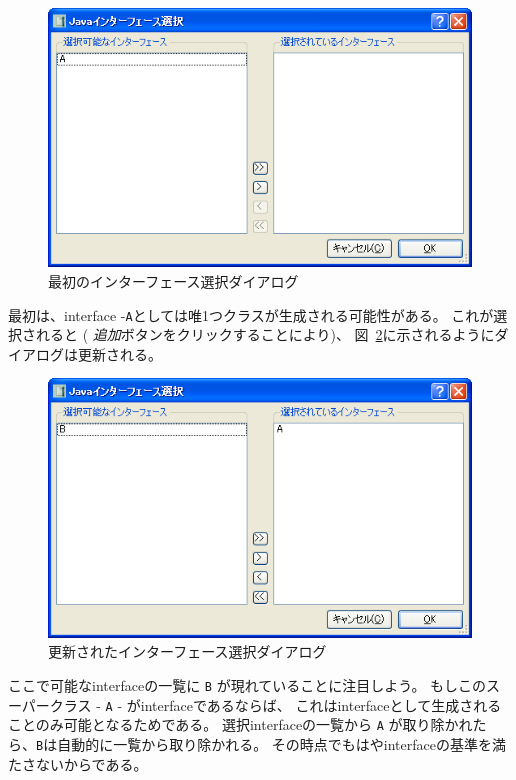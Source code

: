 \documentclass[\pformat,11pt]{jarticle}
\begin{document}
\begin{figure}
\begin{center}
\includegraphics[width=.8\textwidth]{interfaces1}
\end{center}
\caption{最初のインターフェース選択ダイアログ}\label{fig:interfaces1}
\end{figure}

最初は、interface -\texttt{A}としては唯1つクラスが生成される可能性がある。
これが選択されると ( \textit{追加}ボタンをクリックすることにより)、
図~\ref{fig:interfaces2}に示されるようにダイアログは更新される。

\begin{figure}
\begin{center}
\includegraphics[width=.8\textwidth]{interfaces2}
\end{center}
\caption{更新されたインターフェース選択ダイアログ}\label{fig:interfaces2}
\end{figure}

ここで可能なinterfaceの一覧に \texttt{B} が現れていることに注目しよう。 
もしこのスーパークラス - \texttt{A} - がinterfaceであるならば、
これはinterfaceとして生成されることのみ可能となるためである。
選択interfaceの一覧から \texttt{A} が取り除かれたら、\texttt{B}は自動的に一覧から取り除かれる。
その時点でもはやinterfaceの基準を満たさないからである。
\end{document}
